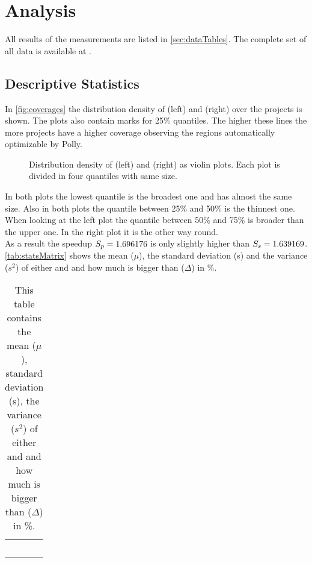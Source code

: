 \chapter{Analysis}
All results of the measurements are listed in \autoref{sec:dataTables}.
The complete set of all data is available at .

\section{Descriptive Statistics}
In \autoref{fig:coverages} the distribution density of \dyncovs (left) and \dyncovp (right) over the projects is shown.
The plots also contain marks for 25\% quantiles.
The higher these lines the more projects have a higher coverage observing the regions automatically optimizable by Polly.
\begin{figure}[!h]
    \caption[Distribution density of \dyncovs and \dyncovp]{
        Distribution density of \dyncovs (left) and \dyncovp (right) as violin plots.
        Each plot is divided in four quantiles with same size.
    }
    
    \label{fig:coverages}
\end{figure}
In both plots the lowest quantile is the broadest one and has almost the same size.
Also in both plots the quantile between 25\% and 50\% is the thinnest one.
When looking at the left plot the quantile between 50\% and 75\% is broader than the upper one.
In the right plot it is the other way round.\\
As a result the speedup \(S_p=1.696176\) is only slightly higher than \(S_s=1.639169\).\\
\autoref{tab:statsMatrix} shows the mean (\(\mu\)), the standard deviation (s) and the variance (\(s^2\)) of either \dyncovp and \dyncovs and how much \dyncovp is bigger than \dyncovs (\(\Delta\)) in \%.
\begin{table}[!h]
    \myfloatalign
    \begin{tabularx}{\textwidth}{lCCC}
        \tableheadline{} &  & \tableheadline{\(\Delta\)} & \\\toprule
        \\\bottomrule
    \end{tabularx}
    \caption[Statistical evaluations of \dyncovp and \dyncovs]{
        This table contains the mean (\(\mu\)), standard deviation (s), the variance (\(s^2\)) of either \dyncovp and \dyncovs and how much \dyncovp is bigger than \dyncovs (\(\Delta\)) in \%.
    }
    \label{tab:statsMatrix}
\end{table}
